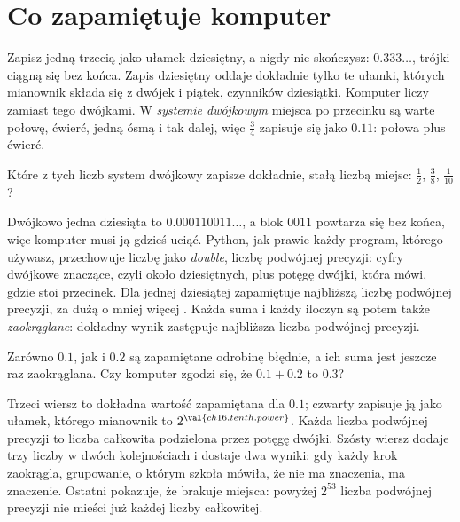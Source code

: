 \section{Co zapamiętuje komputer}
\label{sec:ch16-keeps}

\noindent
Zapisz jedną trzecią jako ułamek dziesiętny, a nigdy nie skończysz:
$\num{0.333}\ldots$, trójki ciągną się bez końca. Zapis dziesiętny oddaje
dokładnie tylko te ułamki, których mianownik składa się z dwójek i piątek,
czynników dziesiątki. Komputer liczy zamiast tego dwójkami. W \emph{systemie
dwójkowym} miejsca po przecinku są warte połowę, ćwierć, jedną ósmą i tak
dalej, więc $\tfrac{3}{4}$ zapisuje się jako $\num{0.11}$: połowa plus ćwierć.

\begin{think}
Które z tych liczb system dwójkowy zapisze dokładnie, stałą liczbą miejsc:
$\tfrac{1}{2}$, $\tfrac{3}{8}$, $\tfrac{1}{10}$?
\end{think}
Dwójkowo jedna dziesiąta to $\num{0.000110011}\ldots$, a blok $0011$
powtarza się bez końca, więc komputer musi ją gdzieś uciąć. Python, jak
prawie każdy program, którego używasz, przechowuje liczbę jako
\emph{double}, liczbę podwójnej precyzji:  cyfry
dwójkowe znaczące, czyli około  dziesiętnych,
plus potęgę dwójki, która mówi, gdzie stoi przecinek. Dla jednej dziesiątej
zapamiętuje najbliższą liczbę podwójnej precyzji, za dużą o mniej więcej
. Każda suma i każdy iloczyn są potem także
\emph{zaokrąglane}: dokładny wynik zastępuje najbliższa liczba podwójnej
precyzji.

\begin{think}
Zarówno $\num{0.1}$, jak i $\num{0.2}$ są zapamiętane odrobinę błędnie, a ich
suma jest jeszcze raz zaokrąglana. Czy komputer zgodzi się, że
$\num{0.1} + \num{0.2}$ to $\num{0.3}$?
\end{think}



\noindent
Trzeci wiersz to dokładna wartość zapamiętana dla $\num{0.1}$; czwarty
zapisuje ją jako ułamek, którego mianownik to $2^{\val{ch16.tenth.power}}$.
Każda liczba podwójnej precyzji to liczba całkowita podzielona przez potęgę
dwójki. Szósty wiersz dodaje trzy liczby w dwóch kolejnościach i dostaje dwa
wyniki: gdy każdy krok zaokrągla, grupowanie, o którym szkoła mówiła, że nie
ma znaczenia, ma znaczenie. Ostatni pokazuje, że brakuje miejsca: powyżej
$2^{53}$ liczba podwójnej precyzji nie mieści już każdej liczby całkowitej.


